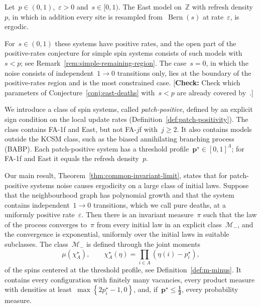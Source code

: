 \documentclass[EJP,preprint,NODS,nobera]{ejpecp}
\newcommand{\Z}{\mathbb{Z}}
\newcommand{\bb}[1]{\left(#1\right)}
\newcommand{\cb}[1]{\left\{#1\right\}}
\newcommand{\mb}[1]{\mathbf{#1}}
\newcommand{\mbs}[1]{\boldsymbol{#1}}
\newcommand{\authorcheck}[1]{{\color{blue}[\textbf{Check:} #1]}}
\begin{document}
\begin{conjecture}
\label{conj:east-deaths}
Let~$p\in(0,1)$,~$\varepsilon>0$ and~$s\in[0,1)$. The East model on~$\Z$ with
refresh density~$p$, in which in addition every site is resampled
from~$\operatorname{Bern}(s)$ at rate~$\varepsilon$, is ergodic.
\end{conjecture}

For~$s\in(0,1)$ these systems have positive rates, and the open part of the
positive-rates conjecture for simple spin systems consists of such models
with~$s<p$; see Remark~\ref{rem:simple-remaining-region}. The case~$s=0$, in
which the noise consists of independent~$1\to0$ transitions only, lies at
the boundary of the positive-rates region and is the most constrained case.
\authorcheck{Check which parameters of Conjecture~\ref{conj:east-deaths}
with~$s<p$ are already covered by~\cite{GluchowskiMenz2025,GluchowskiMenz2026}.}

We introduce a class of spin systems, called \emph{patch-positive}, defined
by an explicit sign condition on the local update rates
(Definition~\ref{def:patch-positivity}). The class contains FA-1f and East,
but not FA-$j$f with~$j\geq2$. It also contains models outside the KCSM
class, such as the biased annihilating branching process (BABP). Each
patch-positive system has a threshold profile~$\mb p^\star\in[0,1]^\Lambda$;
for FA-1f and East it equals the refresh density~$p$.

Our main result, Theorem~\ref{thm:common-invariant-limit}, states that for
patch-positive systems noise causes ergodicity on a large class of initial
laws. Suppose that the neighbourhood graph has polynomial growth and that the
system contains independent~$1\to0$ transitions, which we call pure deaths,
at a uniformly positive rate~$\varepsilon$. Then there is an invariant
measure~$\pi$ such that the law of the process converges to~$\pi$ from every
initial law in an explicit class~$\mathcal M_-$, and the convergence is
exponential, uniformly over the initial laws in suitable subclasses. The
class~$\mathcal M_-$ is defined through the joint moments
\begin{equation*}
\mu\bb{\chi_A^\star},
\qquad
\chi_A^\star(\eta)
=
\prod_{i\in A}\bb{\eta(i)-p_i^\star},
\end{equation*}
of the spins centered at the threshold profile, see
Definition~\ref{def:m-minus}. It contains every configuration with finitely
many vacancies, every product measure with densities at
least~$\max\cb{2p_i^\star-1,0}$, and, if~$\mb p^\star\leq\mbs{\tfrac12}$,
every probability measure.
\end{document}

